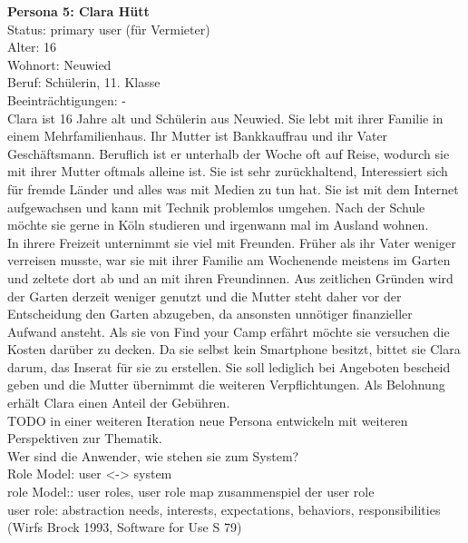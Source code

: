 \newpage
\textbf{Persona 5: Clara Hütt}\\
Status: primary user (für Vermieter)\\

Alter: 16\\
Wohnort: Neuwied\\
Beruf: Schülerin, 11. Klasse \\
Beeinträchtigungen: - \\

Clara ist 16 Jahre alt und Schülerin aus Neuwied. 
Sie lebt mit ihrer Familie in einem Mehrfamilienhaus. Ihr Mutter ist Bankkauffrau und ihr Vater Geschäftsmann. Beruflich ist er unterhalb der Woche oft auf Reise, wodurch sie mit ihrer Mutter oftmals alleine ist.
Sie ist sehr zurückhaltend, Interessiert sich für fremde Länder und alles was mit Medien zu tun hat. Sie ist mit dem Internet aufgewachsen und kann mit Technik problemlos umgehen.
Nach der Schule möchte sie gerne in Köln studieren und irgenwann mal im Ausland wohnen.\\
In ihrere Freizeit unternimmt sie viel mit Freunden. Früher als ihr Vater weniger verreisen musste, war sie mit ihrer Familie am Wochenende meistens im Garten und zeltete dort ab und an mit ihren Freundinnen.
Aus zeitlichen Gründen wird der Garten derzeit weniger genutzt und die Mutter steht daher vor der Entscheidung den Garten abzugeben, da ansonsten unnötiger finanzieller Aufwand ansteht.
Als sie von Find your Camp erfährt möchte sie versuchen die Kosten darüber zu decken. Da sie selbst kein Smartphone besitzt, bittet sie Clara darum, das Inserat für sie zu erstellen. Sie soll lediglich bei Angeboten bescheid geben und die Mutter übernimmt die weiteren Verpflichtungen. Als Belohnung erhält Clara einen Anteil der Gebühren.\\


TODO in einer weiteren Iteration neue Persona entwickeln mit weiteren Perspektiven zur Thematik.\\


Wer sind die Anwender, wie stehen sie zum System?\\


Role Model: user <-> system\\
role Model:: user roles, user role map zusammenspiel der user role\\
user role: abstraction needs, interests, expectations, behaviors, responsibilities (Wirfs Brock 1993, Software for Use S 79)\\

